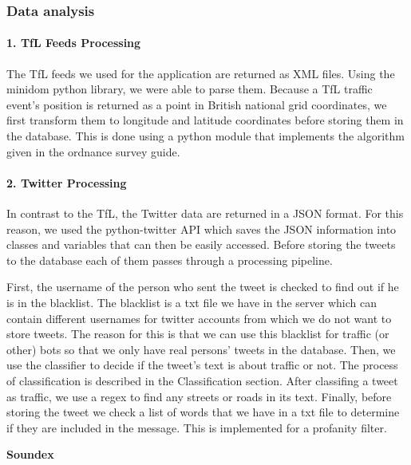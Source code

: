 \subsubsection{Data analysis}
\paragraph{1. TfL Feeds Processing}
The TfL feeds we used for the application are returned as XML files. Using the minidom python library, we were able to parse them. Because a TfL traffic event's position is returned as a point in British national grid coordinates, we first transform them to longitude and latitude coordinates before storing them in the database. This is done using a python module that implements the algorithm given in the ordnance survey guide.\cite{website:grid2lonlat_alg} \cite{website:grid2lonlat_impl}

\paragraph{2. Twitter Processing}
In contrast to the TfL, the Twitter data are returned in a JSON format. For this reason, we used the python-twitter API which saves the JSON information into classes and variables that can then be easily accessed. Before storing the tweets to the database each of them passes through a processing pipeline.

First, the username of the person who sent the tweet is checked to find out if he is in the blacklist. The blacklist is a txt file we have in the server which can contain different usernames for twitter accounts from which we do not want to store tweets. The reason for this is that we can use this blacklist for traffic (or other) bots so that we only have real persons' tweets in the database. Then, we use the classifier to decide if the tweet's text is about traffic or not. The process of classification is described in the Classification section. After classifing a tweet as traffic, we use a regex to find any streets or roads in its text. Finally, before storing the tweet we check a list of words that we have in a txt file to determine if they are included in the message. This is implemented for a profanity filter.

\textbf{Soundex}

